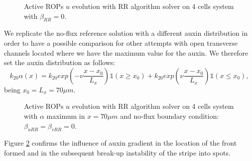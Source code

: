 \begin{figure}[H]
    \centering
    \quad
    \quad
    \quad
    \quad
    \caption[4cell RR Active ROPs - $\beta_{RR} = 0 $]{Active ROPs $u$ evolution with RR algorithm solver on 4 cells system with $\beta_{RR} = 0 $.}
    \label{fig:4cbeta0}
\end{figure}
We replicate the no-flux reference solution with a different auxin distribution in order to have a possible comparison for other attempts with open transverse channels located where we have the maximum value for the auxin. We therefore set the auxin distribution as follows:
\begin{equation*}
  k_{20} \alpha(x) = k_{20} exp\left(-\nu \frac{x-x_0}{L_x}\right) \mathbb{1}(x\geq x_0) + k_{20} exp\left(\nu \frac{x-x_0}{L_x}\right) \mathbb{1}(x\leq x_0),
\end{equation*}
being $x_0 =  L_x = 70 \mu m$.

\begin{figure}[H]
    \centering
    \quad
    \quad
    \quad
    \quad
    \caption[4cell RR Active ROPs - mid gradient, no-flux BC]{Active ROPs $u$ evolution with RR algorithm solver on 4 cells system with $\alpha$ maximum in $x = 70 \mu m$ and no-flux boundary condition: $\beta_{uRR} = \beta_{vRR} = 0$.}
    \label{fig:4c_gradmid_beta0}
\end{figure}
Figure \ref{fig:4c_gradmid_beta0} confirms the influence of auxin gradient in the location of the front formed and in the subsequent break-up instability of the stripe into spots.

